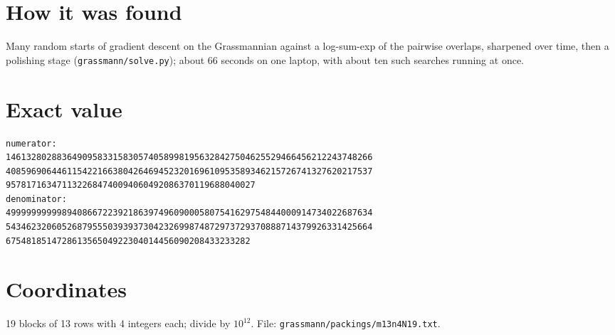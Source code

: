 \documentclass[11pt,a4paper]{article}
\begin{document}
\section{How it was found}
Many random starts of gradient descent on the Grassmannian against a log-sum-exp of the pairwise overlaps, sharpened over time, then a polishing stage (\texttt{grassmann/solve.py}); about 66 seconds on one laptop, with about ten such searches running at once.


\appendix
\section{Exact value}
{\small
\begin{verbatim}
numerator:
146132802883649095833158305740589981956328427504625529466456212243748266
408596906446115422166380426469452320169610953589346215726741327620217537
9578171634711322684740094060492086370119688040027
denominator:
499999999998940866722392186397496090005807541629754844000914734022687634
543462320605268795550393937304232699874872973729370888714379926331425664
675481851472861356504922304014456090208433233282
\end{verbatim}}

\section{Coordinates}
19 blocks of 13 rows with 4 integers each; divide by $10^{12}$. File: \texttt{grassmann/packings/m13n4N19.txt}.
{\tiny
\begin{multicols}{3}
\end{multicols}}
\end{document}
